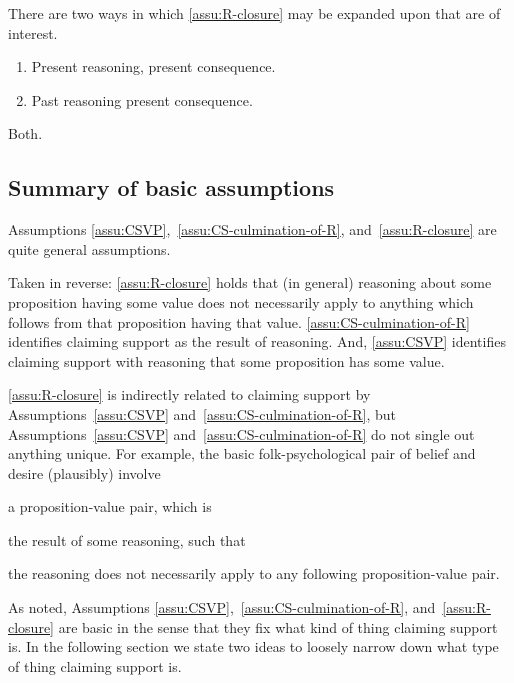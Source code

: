 \begin{note}
  There are two ways in which \autoref{assu:R-closure} may be expanded upon that are of interest.

  \begin{enumerate}
  \item Present reasoning, present consequence.
  \item Past reasoning present consequence.
  \end{enumerate}

  Both.
\end{note}

\subsection{Summary of basic assumptions}
\label{sec:summary}

\begin{note}
  Assumptions \ref{assu:CSVP},~\ref{assu:CS-culmination-of-R}, and~\ref{assu:R-closure} are quite general assumptions.

  Taken in reverse:
  \autoref{assu:R-closure} holds that (in general) reasoning about some proposition having some value does not necessarily apply to anything which follows from that proposition having that value.
  \autoref{assu:CS-culmination-of-R} identifies claiming support as the result of reasoning.
  And, \autoref{assu:CSVP} identifies claiming support with reasoning that some proposition has some value.

  \autoref{assu:R-closure} is indirectly related to claiming support by Assumptions~\ref{assu:CSVP} and~\ref{assu:CS-culmination-of-R}, but Assumptions~\ref{assu:CSVP} and~\ref{assu:CS-culmination-of-R} do not single out anything unique.
  For example, the basic folk-psychological pair of belief and desire (plausibly) involve
  \begin{enumerate*}
  \item a proposition-value pair, which is
  \item the result of some reasoning, such that
  \item the reasoning does not necessarily apply to any following proposition-value pair.
  \end{enumerate*}
  As noted, Assumptions \ref{assu:CSVP},~\ref{assu:CS-culmination-of-R}, and~\ref{assu:R-closure} are basic in the sense that they fix what kind of thing claiming support is.
  In the following section we state two ideas to loosely narrow down what type of thing claiming support is.
\end{note}


